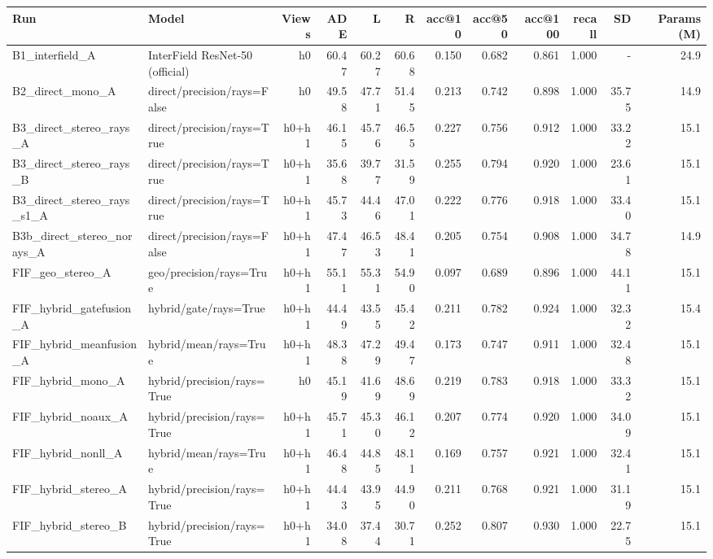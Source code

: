 \begin{tabular}{llrrrrrrrrrr}
\toprule
Run & Model & Views & ADE & L & R & acc@10 & acc@50 & acc@100 & recall & SD & Params (M) \\
\midrule
B1\_interfield\_A & InterField ResNet-50 (official) & h0 & 60.47 & 60.27 & 60.68 & 0.150 & 0.682 & 0.861 & 1.000 & - & 24.9 \\
B2\_direct\_mono\_A & direct/precision/rays=False & h0 & 49.58 & 47.71 & 51.45 & 0.213 & 0.742 & 0.898 & 1.000 & 35.75 & 14.9 \\
B3\_direct\_stereo\_rays\_A & direct/precision/rays=True & h0+h1 & 46.15 & 45.76 & 46.55 & 0.227 & 0.756 & 0.912 & 1.000 & 33.22 & 15.1 \\
B3\_direct\_stereo\_rays\_B & direct/precision/rays=True & h0+h1 & 35.68 & 39.77 & 31.59 & 0.255 & 0.794 & 0.920 & 1.000 & 23.61 & 15.1 \\
B3\_direct\_stereo\_rays\_s1\_A & direct/precision/rays=True & h0+h1 & 45.73 & 44.46 & 47.01 & 0.222 & 0.776 & 0.918 & 1.000 & 33.40 & 15.1 \\
B3b\_direct\_stereo\_norays\_A & direct/precision/rays=False & h0+h1 & 47.47 & 46.53 & 48.41 & 0.205 & 0.754 & 0.908 & 1.000 & 34.78 & 14.9 \\
FIF\_geo\_stereo\_A & geo/precision/rays=True & h0+h1 & 55.11 & 55.31 & 54.90 & 0.097 & 0.689 & 0.896 & 1.000 & 44.11 & 15.1 \\
FIF\_hybrid\_gatefusion\_A & hybrid/gate/rays=True & h0+h1 & 44.49 & 43.55 & 45.42 & 0.211 & 0.782 & 0.924 & 1.000 & 32.32 & 15.4 \\
FIF\_hybrid\_meanfusion\_A & hybrid/mean/rays=True & h0+h1 & 48.38 & 47.29 & 49.47 & 0.173 & 0.747 & 0.911 & 1.000 & 32.48 & 15.1 \\
FIF\_hybrid\_mono\_A & hybrid/precision/rays=True & h0 & 45.19 & 41.69 & 48.69 & 0.219 & 0.783 & 0.918 & 1.000 & 33.32 & 15.1 \\
FIF\_hybrid\_noaux\_A & hybrid/precision/rays=True & h0+h1 & 45.71 & 45.30 & 46.12 & 0.207 & 0.774 & 0.920 & 1.000 & 34.09 & 15.1 \\
FIF\_hybrid\_nonll\_A & hybrid/mean/rays=True & h0+h1 & 46.48 & 44.85 & 48.11 & 0.169 & 0.757 & 0.921 & 1.000 & 32.41 & 15.1 \\
FIF\_hybrid\_stereo\_A & hybrid/precision/rays=True & h0+h1 & 44.43 & 43.95 & 44.90 & 0.211 & 0.768 & 0.921 & 1.000 & 31.19 & 15.1 \\
FIF\_hybrid\_stereo\_B & hybrid/precision/rays=True & h0+h1 & 34.08 & 37.44 & 30.71 & 0.252 & 0.807 & 0.930 & 1.000 & 22.75 & 15.1 \\

\end{tabular}
